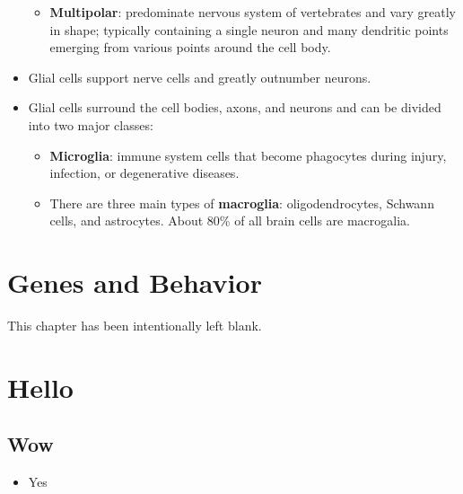 \documentclass[12pt,a4paper]{article}
\begin{document}
\begin{itemize}
\begin{itemize}
            \item \textbf{Multipolar}: predominate nervous system of vertebrates and vary greatly in shape; typically containing a single neuron and many dendritic points emerging from various points around the cell body.
        \end{itemize}
    \item Glial cells support nerve cells and greatly outnumber neurons. 
    \item Glial cells surround the cell bodies, axons, and neurons and can be divided into two major classes:
        \begin{itemize}
            \item \textbf{Microglia}: immune system cells that become phagocytes during injury, infection, or degenerative diseases. 
            \item There are three main types of \textbf{macroglia}: oligodendrocytes, Schwann cells, and astrocytes. About 80\% of all brain cells are macrogalia.
        \end{itemize}
\end{itemize}

\clearpage
\section{Genes and Behavior}

\begin{center}
    This chapter has been intentionally left blank.
\end{center}



\clearpage
\section{Hello}
\subsection{Wow}
\begin{itemize}
    \item Yes
\end{itemize}
\end{document}
